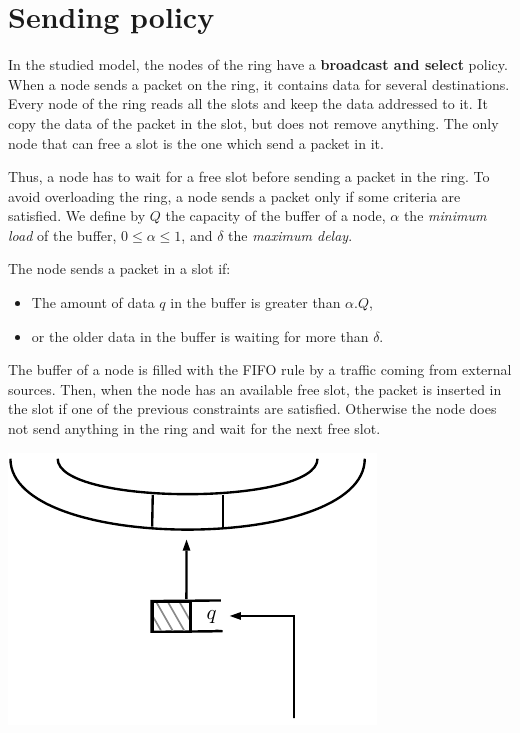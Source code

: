 \documentclass[a4paper,10pt]{article}
\begin{document}
\section*{Sending policy}
In the studied model, the nodes of the ring have a {\bf broadcast and select} policy.
When a node sends a packet on the ring, it contains data for several destinations. Every node of the ring reads all the slots and keep the data addressed to it. It copy the data of the packet in the slot, but does not remove anything. The only node that can free a slot is the one which send a packet in it.



Thus, a node has to wait for a free slot before sending a packet in the ring. To avoid overloading the ring, a node sends a packet only if some criteria  are satisfied.
We define by $Q$ the capacity of the buffer of a node, $\alpha$ the {\em minimum load} of the buffer, $0 \leq  \alpha \leq 1$, and $\delta$ the {\em maximum delay}.

The node sends a packet in a slot if:
\begin{itemize}
 \item The amount of data $q$ in the buffer is greater than $\alpha . Q$,
 \item or the older data in the buffer is waiting for more than $\delta$.
\end{itemize}

The buffer of a node is filled with the FIFO rule by a traffic coming from external sources. Then, when the node has an available free slot, the packet is inserted in the slot if one of the previous constraints are satisfied. Otherwise the node does not send anything in the ring and wait for the next free slot.

\begin{center}   

      \includegraphics[scale=0.7]{insertion0.pdf}

  
\end{center}
\end{document}
